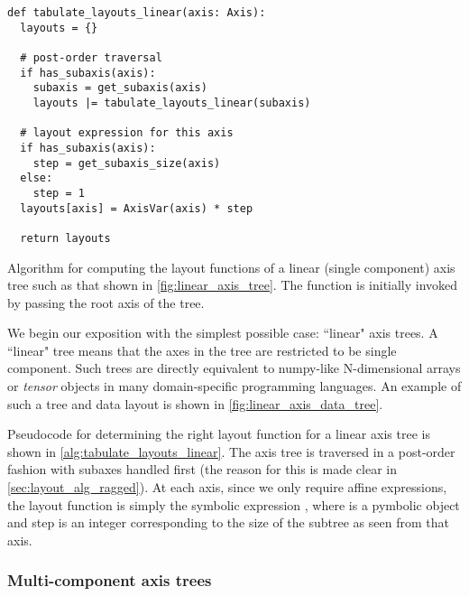 \documentclass[thesis]{subfiles}
\begin{document}
\begin{algorithm}
  \begin{verbatim}
def tabulate_layouts_linear(axis: Axis):
  layouts = {}

  # post-order traversal
  if has_subaxis(axis): 
    subaxis = get_subaxis(axis)
    layouts |= tabulate_layouts_linear(subaxis)

  # layout expression for this axis
  if has_subaxis(axis):
    step = get_subaxis_size(axis)
  else:
    step = 1
  layouts[axis] = AxisVar(axis) * step

  return layouts
  \end{verbatim}
  \caption{
    Algorithm for computing the layout functions of a linear (single component) axis tree such as that shown in \cref{fig:linear_axis_tree}.
    The function is initially invoked by passing the root axis of the tree.
  }
  \label{alg:tabulate_layouts_linear}
\end{algorithm}

We begin our exposition with the simplest possible case: ``linear" axis trees.
A ``linear" tree means that the axes in the tree are restricted to be single component.
Such trees are directly equivalent to numpy-like N-dimensional arrays or \textit{tensor} objects in many domain-specific programming languages.
An example of such a tree and data layout is shown in \cref{fig:linear_axis_data_tree}.

Pseudocode for determining the right layout function for a linear axis tree is shown in \cref{alg:tabulate_layouts_linear}.
The axis tree is traversed in a post-order fashion with subaxes handled first (the reason for this is made clear in \cref{sec:layout_alg_ragged}).
At each axis, since we only require affine expressions, the layout function is simply the symbolic expression , where  is a pymbolic  object and step is an integer corresponding to the size of the subtree as seen from that axis.

\subsubsection{Multi-component axis trees}
\label{sec:layout_alg_multi_component}
\end{document}
